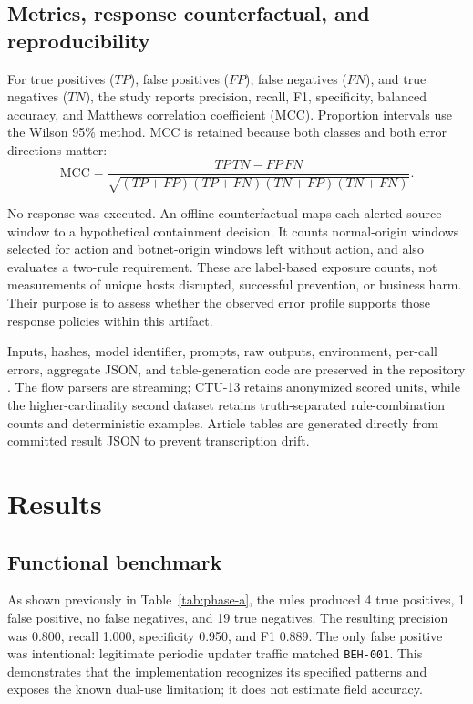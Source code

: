 \documentclass[11pt,a4paper,onecolumn]{IEEEtran}
\begin{document}
\subsection{Metrics, response counterfactual, and reproducibility}

For true positives ($TP$), false positives ($FP$), false negatives ($FN$), and true negatives ($TN$), the study reports precision, recall, F1, specificity, balanced accuracy, and Matthews correlation coefficient (MCC). Proportion intervals use the Wilson 95\% method. MCC is retained because both classes and both error directions matter:
\begin{equation}
\mathrm{MCC}=\frac{TP\,TN-FP\,FN}
{\sqrt{(TP+FP)(TP+FN)(TN+FP)(TN+FN)}}.
\end{equation}

No response was executed. An offline counterfactual maps each alerted source-window to a hypothetical containment decision. It counts normal-origin windows selected for action and botnet-origin windows left without action, and also evaluates a two-rule requirement. These are label-based exposure counts, not measurements of unique hosts disrupted, successful prevention, or business harm. Their purpose is to assess whether the observed error profile supports those response policies within this artifact.

Inputs, hashes, model identifier, prompts, raw outputs, environment, per-call errors, aggregate JSON, and table-generation code are preserved in the repository \cite{ielen2025repo}. The flow parsers are streaming; CTU-13 retains anonymized scored units, while the higher-cardinality second dataset retains truth-separated rule-combination counts and deterministic examples. Article tables are generated directly from committed result JSON to prevent transcription drift.

\section{Results}

\subsection{Functional benchmark}

As shown previously in Table~\ref{tab:phase-a}, the rules produced 4 true positives, 1 false positive, no false negatives, and 19 true negatives. The resulting precision was 0.800, recall 1.000, specificity 0.950, and F1 0.889. The only false positive was intentional: legitimate periodic updater traffic matched \texttt{BEH-001}. This demonstrates that the implementation recognizes its specified patterns and exposes the known dual-use limitation; it does not estimate field accuracy.
\end{document}
